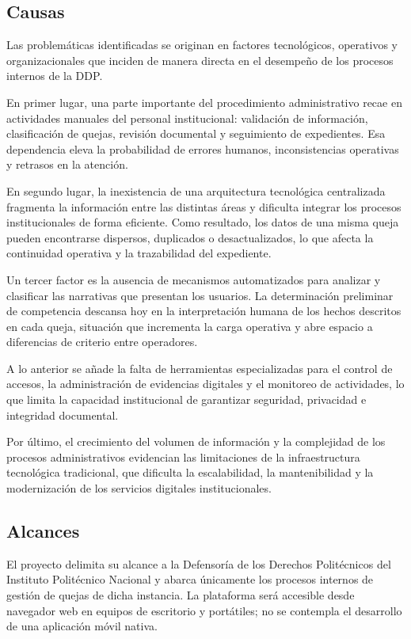 	\subsection{Causas}
	Las problemáticas identificadas se originan en factores tecnológicos, operativos y organizacionales
	que inciden de manera directa en el desempeño de los procesos internos de la DDP.
	
	En primer lugar, una parte importante del procedimiento administrativo recae en actividades manuales
	del personal institucional: validación de información, clasificación de quejas, revisión documental
	y seguimiento de expedientes. Esa dependencia eleva la probabilidad de errores humanos,
	inconsistencias operativas y retrasos en la atención.
	
	En segundo lugar, la inexistencia de una arquitectura tecnológica centralizada fragmenta la
	información entre las distintas áreas y dificulta integrar los procesos institucionales de forma
	eficiente. Como resultado, los datos de una misma queja pueden encontrarse dispersos, duplicados o
	desactualizados, lo que afecta la continuidad operativa y la trazabilidad del expediente.
	
	Un tercer factor es la ausencia de mecanismos automatizados para analizar y clasificar las narrativas
	que presentan los usuarios. La determinación preliminar de competencia descansa hoy en la
	interpretación humana de los hechos descritos en cada queja, situación que incrementa la carga
	operativa y abre espacio a diferencias de criterio entre operadores.
	
	A lo anterior se añade la falta de herramientas especializadas para el control de accesos, la
	administración de evidencias digitales y el monitoreo de actividades, lo que limita la capacidad
	institucional de garantizar seguridad, privacidad e integridad documental.
	
	Por último, el crecimiento del volumen de información y la complejidad de los procesos
	administrativos evidencian las limitaciones de la infraestructura tecnológica tradicional, que
	dificulta la escalabilidad, la mantenibilidad y la modernización de los servicios digitales
	institucionales.
	
	\subsection{Alcances}
	El proyecto delimita su alcance a la Defensoría de los Derechos Politécnicos del Instituto
	Politécnico Nacional y abarca únicamente los procesos internos de gestión de quejas de dicha
	instancia. La plataforma será accesible desde navegador web en equipos de escritorio y portátiles;
	no se contempla el desarrollo de una aplicación móvil nativa.
	
